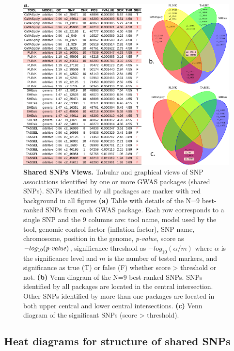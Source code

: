 \documentclass{article}
\begin{document}
\begin{figure}[H]
\begin{centering}
\includegraphics{images/paper-table-venn-best}
\par\end{centering}
\caption{\textbf{Shared SNPs Views. }Tabular and graphical views of SNP associations
identified by one or more GWAS packages (shared SNPs). SNPs identified
by all packages are marker with red background in all figures \textbf{(a)}
Table with details of the N=9 best-ranked SNPs from each GWAS package.
Each row corresponds to a single SNP and the 9 columns are: tool name,
model used by the tool, genomic control factor (inflation factor),
SNP name, chromosome, position in the genome, \emph{p-value}, score
as $-log_{10}({\operatorname{\mathit{p-value}}})$, significance threshold as $-log_{10}(\alpha/m)$
where $\alpha$ is the significance level and $m$ is the number of
tested markers, and significance as true (T) or false (F) whether
score > threshold or not. \textbf{(b)} Venn diagram of the N=9 best-ranked
SNPs. SNPs identified by all packages are located in the central intersection.
Other SNPs identified by more than one packages are located in both
upper central and lower central intersections. \textbf{(c)} Venn diagram
of the significant SNPs (score > threshold). \label{fig:Table-Shared-SNPs}}
\end{figure}

 

\subsection{Heat diagrams for structure of shared SNPs}
\end{document}
